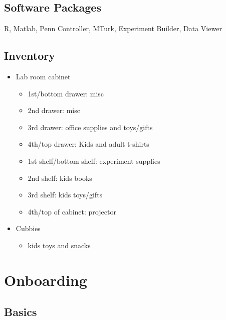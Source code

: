 \documentclass[
]{book}
\providecommand{\tightlist}{%
  \setlength{\itemsep}{0pt}\setlength{\parskip}{0pt}}
\begin{document}
\hypertarget{software-packages}{%
\section{Software Packages}\label{software-packages}}

R, Matlab, Penn Controller, MTurk, Experiment Builder, Data Viewer

\hypertarget{inventory}{%
\section{Inventory}\label{inventory}}

\begin{itemize}
\tightlist
\item
  Lab room cabinet

  \begin{itemize}
  \tightlist
  \item
    1st/bottom drawer: misc
  \item
    2nd drawer: misc
  \item
    3rd drawer: office supplies and toys/gifts
  \item
    4th/top drawer: Kids and adult t-shirts
  \item
    1st shelf/bottom shelf: experiment supplies
  \item
    2nd shelf: kids books
  \item
    3rd shelf: kids toys/gifts
  \item
    4th/top of cabinet: projector
  \end{itemize}
\item
  Cubbies

  \begin{itemize}
  \tightlist
  \item
    kids toys and snacks
  \end{itemize}
\end{itemize}

\hypertarget{onboarding}{%
\chapter{Onboarding}\label{onboarding}}

\hypertarget{basics}{%
\section*{Basics}\label{basics}}
\end{document}
